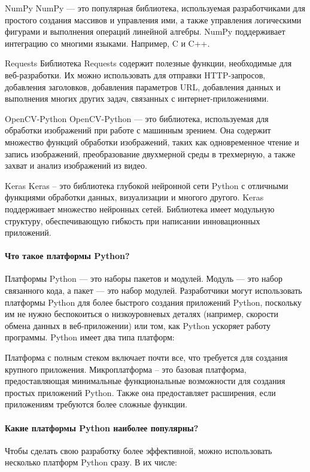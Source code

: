 NumPy
NumPy — это популярная библиотека, используемая разработчиками для простого создания массивов и управления ими, а также управления логическими фигурами и выполнения операций линейной алгебры. NumPy поддерживает интеграцию со многими языками. Например, C и C++.

Requests
Библиотека Requests содержит полезные функции, необходимые для веб-разработки. Их можно использовать для отправки HTTP-запросов, добавления заголовков, добавления параметров URL, добавления данных и выполнения многих других задач, связанных с интернет-приложениями. 

OpenCV-Python
OpenCV-Python — это библиотека, используемая для обработки изображений при работе с машинным зрением. Она содержит множество функций обработки изображений, таких как одновременное чтение и запись изображений, преобразование двухмерной среды в трехмерную, а также захват и анализ изображений из видео.

Keras
Keras – это библиотека глубокой нейронной сети Python с отличными функциями обработки данных, визуализации и многого другого. Keras поддерживает множество нейронных сетей. Библиотека имеет модульную структуру, обеспечивающую гибкость при написании инновационных приложений.

\paragraph{Что такое платформы Python?}
Платформы Python — это наборы пакетов и модулей. Модуль — это набор связанного кода, а пакет — это набор модулей. Разработчики могут использовать платформы Python для более быстрого создания приложений Python, поскольку им не нужно беспокоиться о низкоуровневых деталях (например, скорости обмена данных в веб-приложении) или том, как Python ускоряет работу программы. Python имеет два типа платформ: 

Платформа с полным стеком включает почти все, что требуется для создания крупного приложения.
Микроплатформа – это базовая платформа, предоставляющая минимальные функциональные возможности для создания простых приложений Python. Также она предоставляет расширения, если приложениям требуются более сложные функции.
\paragraph{Какие платформы Python наиболее популярны?}
Чтобы сделать свою разработку более эффективной, можно использовать несколько платформ Python сразу. В их числе:

